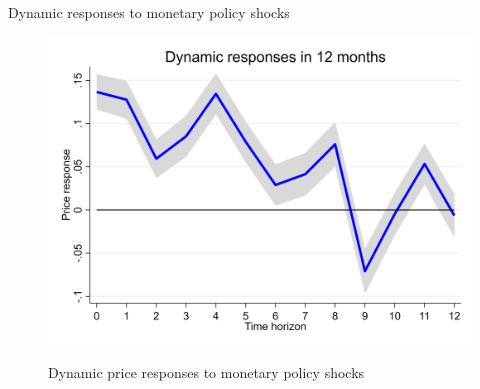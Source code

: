 \documentclass[10pt]{beamer}
\begin{document}
\begin{frame}{Dynamic responses to monetary policy shocks}
    \begin{figure}[htbp]
	\centering
	\includegraphics[width=0.8\columnwidth]{latex/slides/pic_Dec2023/dynamic.png}
	\label{figure_dynamic}
        \caption{Dynamic price responses to monetary policy shocks}
    \end{figure}
    \hyperlink{tab.dynamic}{}
\end{frame}
\end{document}

